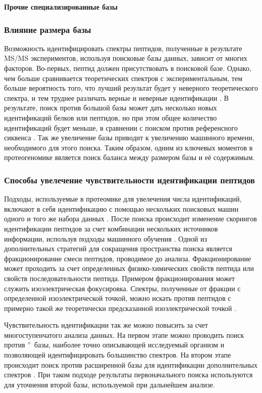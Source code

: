 \textbf{Прочие специализированные базы}

\subsubsection{Влияние размера базы}
Возможность идентифицировать спектры пептидов, полученные в результате MS/MS экспериментов, используя поисковые базы данных, зависит от многих факторов. Во-первых, пептид должен присутствовать в поисковой базе. Однако, чем больше сравнивается теоретических спектров с экспериментальным, тем больше вероятность того, что лучший результат будет у неверного теоретического спектра, и тем труднее различать верные и неверные идентификации \cite{nesvizhskii2010survey}. В результате, поиск против большой базы может дать несколько новых идентификаций белков или пептидов, но при этом общее количество идентификаций будет меньше, в сравнении с поиском против референсного сиквенса \cite{blakeley2012addressing, krug2013deep}. Так же увеличение базы приводит к увеличению машинного времени, необходимого для этого поиска. Таким образом, одним из ключевых моментов в протеогеномике является поиск баланса между размером базы и её содержимым.

\subsubsection{Способы увелечение чувствительности идентификации пептидов}
Подходы, используемые в протеомике для увелечения числа идентификаций, включают в себя идентификацию с помощью нескольких поисковых машин одного и того же набора данных \cite{shteynberg2013combining}. После поиска происходит изменение скорингов идентификации пептидов за счет комбинации нескольких источников информации, используя подходы машинного обучения \cite{nesvizhskii2010survey}. Одной из дополнительных стратегий для сокращения пространства поиска является фракционирование смеси пептидов, проводимое до  анализа. Фракционирование может проходить за счет определенных физико-химических свойств пептида или свойств последовательности пептида. Примером фракционирования может служить изоэлектрическая фокусировка. Спектры, полученные от фракции с определенной изоэлектрической точкой, можно искать против пептидов с примерно такой же теоретически предсказанной изоэлектрической точкой \cite{branca2014hirief}. 

Чувствительность идентификации так же можно повысить за счет многоступенчатого анализа данных. На первом этапе можно проводить поиск против \textquotedblright\ базы, наиболее точно описывающей исследуемый организм и позволяющей идентифицировать большинство спектров. На втором этапе происходит поиск против расширенной базы для идентификации дополнительных спектров \cite{ning2010computational, helmy2012mass}. При таком подходе результаты первоначального поиска используются для уточнения второй базы, используемой при дальнейшем анализе. 

